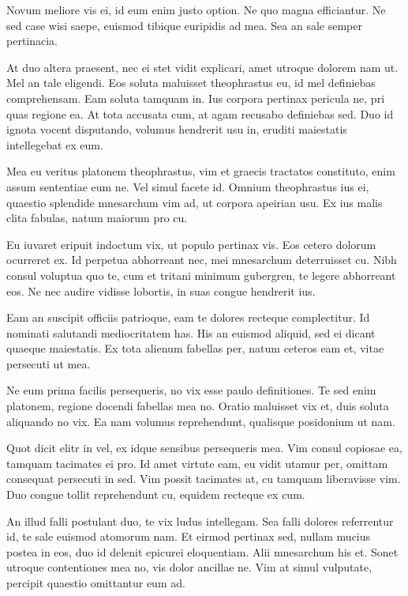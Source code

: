 \documentclass{adhsernotes}
\begin{document}
Novum meliore vis ei, id eum enim justo option. Ne quo magna efficiantur. Ne sed
case wisi saepe, euismod tibique euripidis ad mea. Sea an sale semper
pertinacia.

At duo altera praesent, nec ei stet vidit explicari, amet utroque dolorem nam
ut. Mel an tale eligendi. Eos soluta maluisset theophrastus eu, id mel
definiebas comprehensam. Eam soluta tamquam in. Ius corpora pertinax pericula
ne, pri quas regione ea. At tota accusata cum, at agam recusabo definiebas
sed. Duo id ignota vocent disputando, volumus hendrerit usu in, eruditi
maiestatis intellegebat ex eum.

Mea eu veritus platonem theophrastus, vim et graecis tractatos constituto, enim
assum sententiae eum ne. Vel simul facete id. Omnium theophrastus ius ei,
quaestio splendide mnesarchum vim ad, ut corpora apeirian usu. Ex ius malis
clita fabulas, natum maiorum pro cu.

Eu iuvaret eripuit indoctum vix, ut populo pertinax vis. Eos cetero dolorum
ocurreret ex. Id perpetua abhorreant nec, mei mnesarchum deterruisset cu. Nibh
consul voluptua quo te, cum et tritani minimum gubergren, te legere abhorreant
eos. Ne nec audire vidisse lobortis, in suas congue hendrerit ius.

Eam an suscipit officiis patrioque, eam te dolores recteque complectitur. Id
nominati salutandi mediocritatem has. His an euismod aliquid, sed ei dicant
quaeque maiestatis. Ex tota alienum fabellas per, natum ceteros eam et, vitae
persecuti ut mea.

Ne eum prima facilis persequeris, no vix esse paulo definitiones. Te sed enim
platonem, regione docendi fabellas mea no. Oratio maluisset vix et, duis soluta
aliquando no vix. Ea nam volumus reprehendunt, qualisque posidonium ut nam.

Quot dicit elitr in vel, ex idque sensibus persequeris mea. Vim consul copiosae
ea, tamquam tacimates ei pro. Id amet virtute eam, eu vidit utamur per, omittam
consequat persecuti in sed. Vim possit tacimates at, cu tamquam liberavisse
vim. Duo congue tollit reprehendunt cu, equidem recteque ex cum.

An illud falli postulant duo, te vix ludus intellegam. Sea falli dolores
referrentur id, te sale euismod atomorum nam. Et eirmod pertinax sed, nullam
mucius postea in eos, duo id delenit epicurei eloquentiam. Alii mnesarchum his
et. Sonet utroque contentiones mea no, vis dolor ancillae ne. Vim at simul
vulputate, percipit quaestio omittantur eum ad.
\end{document}
